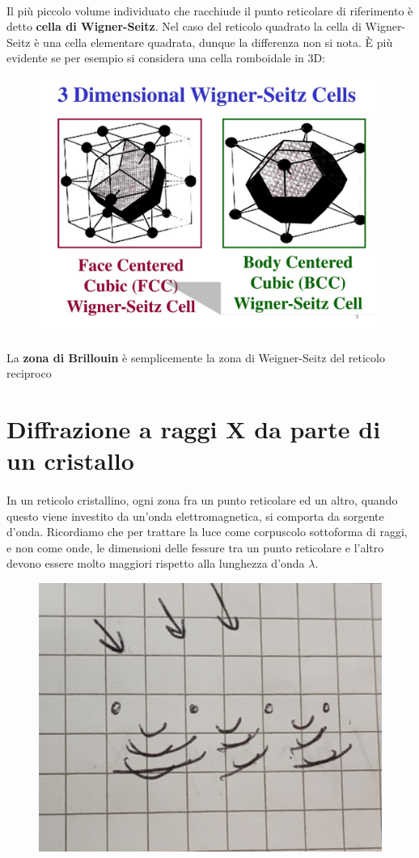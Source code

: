 \documentclass{book}
\begin{document}
        \paragraph{}
            Il più piccolo volume individuato che racchiude il punto reticolare di riferimento è detto \textbf{cella di Wigner-Seitz}. Nel caso del reticolo quadrato la cella di Wigner-Seitz è una cella elementare quadrata, dunque la differenza non si nota. È più evidente se per esempio si considera una cella romboidale in 3D:
            \begin{figure}[h!]
                \centering
                \includegraphics[width=0.35\linewidth]{img/WignerSeitzLez8.png}
                \label{wignerSeitzLez8}
            \end{figure}
            La \textbf{zona di Brillouin} è semplicemente la zona di Weigner-Seitz del reticolo reciproco

        \section{Diffrazione a raggi X da parte di un cristallo}
        \paragraph{}
            In un reticolo cristallino, ogni zona fra un punto reticolare ed un altro, quando questo viene investito da un'onda elettromagnetica, si comporta da sorgente d'onda. Ricordiamo che per trattare la luce come corpuscolo sottoforma di raggi, e non come onde, le dimensioni delle fessure tra un punto reticolare e l'altro devono essere molto maggiori rispetto alla lunghezza d'onda $\lambda$. 
            \begin{figure}[h!]
                \centering
                \includegraphics[width=0.5\linewidth]{img/diffrazioneLez8.png}
            \end{figure}
\end{document}
